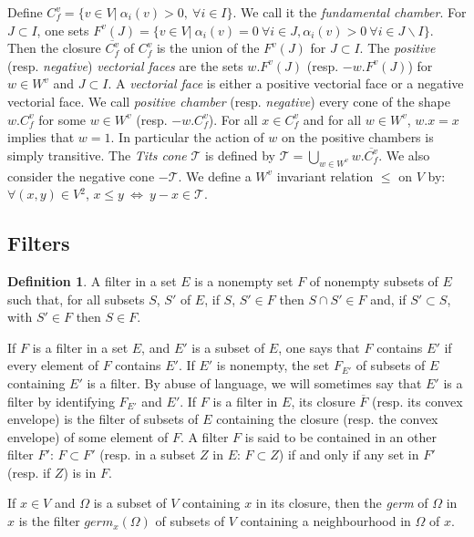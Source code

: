 \documentclass[12pt]{article}
\theoremstyle{plain}
\theoremstyle{definition}
\newtheorem{defn}[thm]{Definition}
\begin{document}
Define $C_f^v=\{v\in V|\  \alpha_i(v)>0,\ \forall i\in I\}$. We call it the \textit{fundamental chamber}. For $J\subset I$, one sets $F^v(J)=\{v\in V|\ \alpha_i(v)=0\ \forall i\in J,\alpha_i(v)>0\ \forall i\in J\backslash I\}$. Then the closure $\overline{C_f^v}$ of $C_f^v$ is the union of the $F^v(J)$ for $J\subset I$. The \textit{positive} (resp. \textit{negative}) \textit{vectorial faces} are the sets $w.F^v(J)$ (resp. $-w.F^v(J)$) for $w\in W^v$  and $J\subset I$. A \textit{vectorial face} is either a positive vectorial face or a negative vectorial face. We call \textit{positive chamber} (resp. \textit{negative}) every cone  of the shape $w.C_f^v$ for some $w\in W^v$ (resp. $-w.C_f^v$).  For all $x\in C_f^v$ and for all $w\in W^v$, $w.x=x$ implies that $w=1$. In particular the action of $w$ on the positive chambers is simply transitive. The \textit{Tits cone} $\mathcal T$ is defined by $\mathcal{T}=\bigcup_{w\in W^v} w.\overline{C^v_f}$. We also consider the negative cone $-\mathcal{T}$.
We define a $W^v$ invariant relation $\leq$ on $V$ by: $\forall (x,y)\in V\mathrm{}^2$, $x\leq y\ \Leftrightarrow\ y-x\in \mathcal{T}$.


\subsection{Filters}

\begin{defn}
A filter in a set $E$ is a nonempty set $F$ of nonempty subsets of $E$ such that, for all subsets $S$, $S'$ of $E$,  if $S$, $S'\in F$ then $S\cap S'\in F$ and, if $S'\subset S$, with $S'\in F$ then $S\in F$.
\end{defn}

If $F$ is a filter in a set $E$, and $E'$ is a subset of $E$, one says that $F$ contains $E'$ if every element of $F$ contains $E'$. If $E'$ is nonempty, the set $F_{E'}$ of subsets of $E$ containing $E'$ is a filter. By abuse of language, we will sometimes say that $E'$ is a filter by identifying $F_{E'}$ and $E'$. If $F$ is a filter in $E$, its closure $\overline F$ (resp. its convex envelope) is the filter of subsets of $E$ containing the closure (resp. the convex envelope) of some element of $F$. A filter $F$ is said to be contained in an other filter $F'$: $F\subset F'$ (resp. in a subset $Z$ in $E$: $F\subset Z$) if and only if any set in $F'$ (resp. if $Z$) is in $F$.

If $x\in V\mathrm{}$ and $\Omega$ is a subset of $V$ containing $x$ in its closure, then the \textit{germ} of $\Omega$ in $x$ is the filter $germ_x(\Omega)$ of subsets of $V$ containing a neighbourhood in $\Omega$ of $x$.
\end{document}
